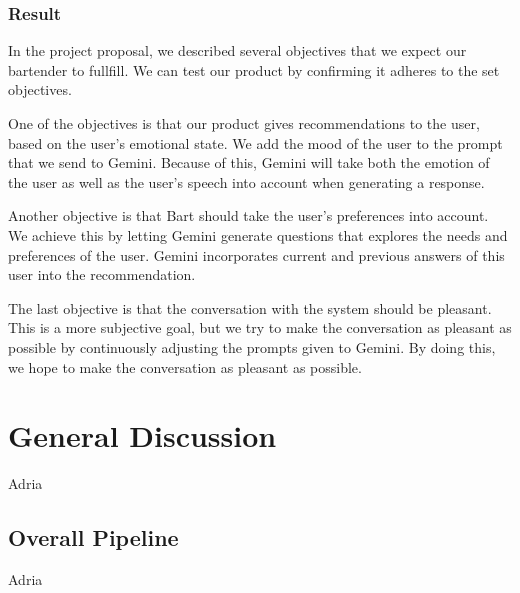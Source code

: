 \documentclass[conference]{IEEEtran}
\begin{document}
\subsubsection{Result}
In the project proposal, we described several objectives that we expect our bartender to fullfill.
We can test our product by confirming it adheres to the set objectives.

One of the objectives is that our product gives recommendations to the user, based on the user's emotional state.
We add the mood of the user to the prompt that we send to Gemini.
Because of this, Gemini will take both the emotion of the user as well as the user's speech into account when generating a response.

Another objective is that Bart should take the user's preferences into account. 
We achieve this by letting Gemini generate questions that explores the needs and preferences of the user.
Gemini incorporates current and previous answers of this user into the recommendation.

The last objective is that the conversation with the system should be pleasant.
This is a more subjective goal, but we try to make the conversation as pleasant as possible by continuously adjusting the prompts given to Gemini.
By doing this, we hope to make the conversation as pleasant as possible.


\section{General Discussion}
Adria\\

\subsection{Overall Pipeline}
Adria
\end{document}
